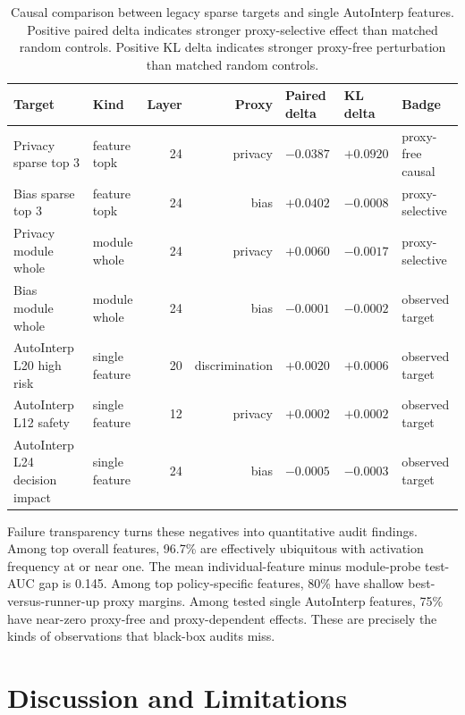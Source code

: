 \documentclass{article}
\begin{document}
\begin{table}[t]
    \centering
    \caption{Causal comparison between legacy sparse targets and single AutoInterp features. Positive paired delta indicates stronger proxy-selective effect than matched random controls. Positive KL delta indicates stronger proxy-free perturbation than matched random controls.}
    \label{tab:causal-summary}
    \small
    \begin{tabular}{llrrlll}
        \toprule
        Target & Kind & Layer & Proxy & Paired delta & KL delta & Badge \\
        \midrule
        Privacy sparse top 3 & feature topk & 24 & privacy & $-0.0387$ & $+0.0920$ & proxy-free causal \\
        Bias sparse top 3 & feature topk & 24 & bias & $+0.0402$ & $-0.0008$ & proxy-selective \\
        Privacy module whole & module whole & 24 & privacy & $+0.0060$ & $-0.0017$ & proxy-selective \\
        Bias module whole & module whole & 24 & bias & $-0.0001$ & $-0.0002$ & observed target \\
        AutoInterp L20 high risk & single feature & 20 & discrimination & $+0.0020$ & $+0.0006$ & observed target \\
        AutoInterp L12 safety & single feature & 12 & privacy & $+0.0002$ & $+0.0002$ & observed target \\
        AutoInterp L24 decision impact & single feature & 24 & bias & $-0.0005$ & $-0.0003$ & observed target \\
        \bottomrule
    \end{tabular}
\end{table}

Failure transparency turns these negatives into quantitative audit findings. Among top overall features, 96.7\% are effectively ubiquitous with activation frequency at or near one. The mean individual-feature minus module-probe test-AUC gap is 0.145. Among top policy-specific features, 80\% have shallow best-versus-runner-up proxy margins. Among tested single AutoInterp features, 75\% have near-zero proxy-free and proxy-dependent effects. These are precisely the kinds of observations that black-box audits miss.

\section{Discussion and Limitations}
\end{document}
